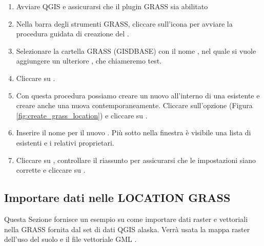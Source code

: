 \begin{enumerate}
  \item Avviare QGIS e assicurarsi che il plugin GRASS sia abilitato
  \item Nella barra degli strumenti GRASS, cliccare sull'icona
   per avviare la procedura guidata
  di creazione del .
  \item Selezionare la cartella GRASS (GISDBASE)  con il
  nome , nel quale si vuole aggiungere un ulteriore
  , che chiameremo test.
  \item Cliccare su . 
  \item Con questa procedura possiamo creare un nuovo 
  all'interno di una  esistente e creare anche una nuova
   contemporaneamente. Cliccare sull'opzione
   (Figura \ref{fig:create_grass_location}) e cliccare su .
  \item Inserire il nome  per il nuovo . Più
  sotto nella finestra è visibile una lista di  esistenti e
  i relativi proprietari.
  \item Cliccare su , controllare il riassunto per
  assicurarsi che le impostazioni siano corrette e cliccare su .
\end{enumerate}

\subsection{Importare dati nelle LOCATION GRASS}\label{sec:import_loc_data}

Questa Sezione fornisce un esempio su come importare dati raster e vettoriali
nella  GRASS  fornita dal set di dati QGIS
alaska. Verrà usata la mappa raster dell'uso del suolo  e
il file vettoriale GML .

